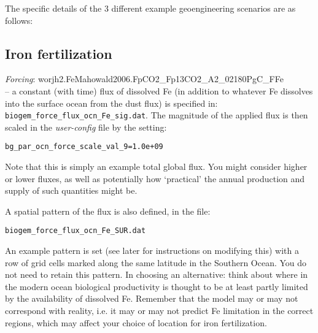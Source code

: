 \documentclass[11pt,fleqn]{book} %
\begin{document}
\vspace{1mm}
The specific details of the 3 different example geoengineering scenarios are as follows:


\subsection{Iron fertilization}

\vspace{2mm}
\textit{Forcing}: \textsf{\footnotesize worjh2.FeMahowald2006.FpCO2\_Fp13CO2\_A2\_02180PgC\_FFe} \vspace{1mm}
\\-- a constant (with time) flux of dissolved Fe (in addition to whatever Fe dissolves into the surface ocean from the dust flux) is specified in: \texttt{biogem\_force\_flux\_ocn\_Fe\_sig.dat}. The magnitude of the applied flux is then scaled in the \textit{user-config} file by the setting:
\vspace{-1mm}
\small\begin{verbatim}
bg_par_ocn_force_scale_val_9=1.0e+09
\end{verbatim}\normalsize
\vspace{-1mm}
Note that this is simply an example total global flux. You might consider higher or lower fluxes, as well as potentially how ‘practical’ the annual production and supply of such quantities might be.

\vspace{1mm}
A spatial pattern of the flux is also defined, in the file:
\vspace{-1mm}
\small\begin{verbatim}
biogem_force_flux_ocn_Fe_SUR.dat
\end{verbatim}\normalsize
\vspace{-1mm}

An example pattern is set (see later for instructions on modifying this) with a row of grid cells  marked along the same latitude in the Southern Ocean. You do not need to retain this pattern. In choosing an alternative: think about where in the modern ocean biological productivity is thought to be at least partly limited by the availability of dissolved Fe. Remember that the model may or may not correspond with reality, i.e. it may or may not predict Fe limitation in the correct regions, which may affect your choice of location for iron fertilization.

\end{document}
